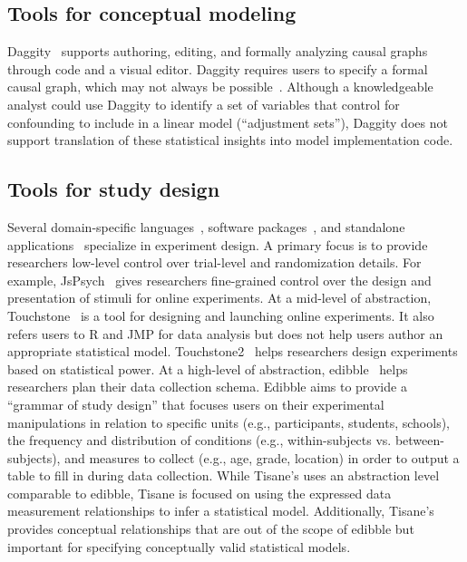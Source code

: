 
\subsection{Tools for conceptual modeling}
Daggity~\cite{textor2011dagitty} supports authoring, editing, and
formally analyzing causal graphs through code and a visual editor. Daggity
requires users to specify a formal causal graph, which may not always be
possible~\cite{suzuki2020causal,suzuki2018mechanisms,velentgas2013developing}.
Although a knowledgeable analyst could use Daggity to identify a set of
variables that control for confounding to include in a linear model
(``adjustment sets''), Daggity does not support translation of these statistical
insights into model implementation code. 

\subsection{Tools for study design}
Several domain-specific languages~\cite{gosset,bakshy2014planout}, software
packages~\cite{edibble,blair2019declaring}, and standalone
applications~\cite{mackay2007touchstone,eiselmayer2019touchstone2} specialize in
experiment design. A primary focus is to provide researchers low-level control
over trial-level and randomization details. For example,
JsPsych~\cite{deLeeuw2015jspsych} gives researchers fine-grained control over
the design and presentation of stimuli for online experiments. At a mid-level of
abstraction, Touchstone~\cite{mackay2007touchstone} is a %
tool for designing and launching online experiments. It also refers users to R
and JMP for data analysis but does not help users author an appropriate
statistical model. Touchstone2~\cite{eiselmayer2019touchstone2} helps
researchers design experiments based on statistical power. At a high-level of
abstraction, edibble~\cite{edibble} helps researchers plan their data collection
schema. Edibble aims to provide a ``grammar of study design'' that focuses users
on their experimental manipulations in relation to specific units (e.g.,
participants, students, schools), the frequency and distribution of conditions
(e.g., within-subjects vs. between-subjects), and measures to collect (e.g.,
age, grade, location) in order to output a table to fill in during data
collection. While Tisane's \SDSLlong uses an abstraction level comparable to
edibble, Tisane is focused on using the expressed data measurement relationships
to infer a statistical model. Additionally, Tisane's \SDSL provides conceptual
relationships that are out of the scope of edibble but important for specifying
conceptually valid statistical models.

